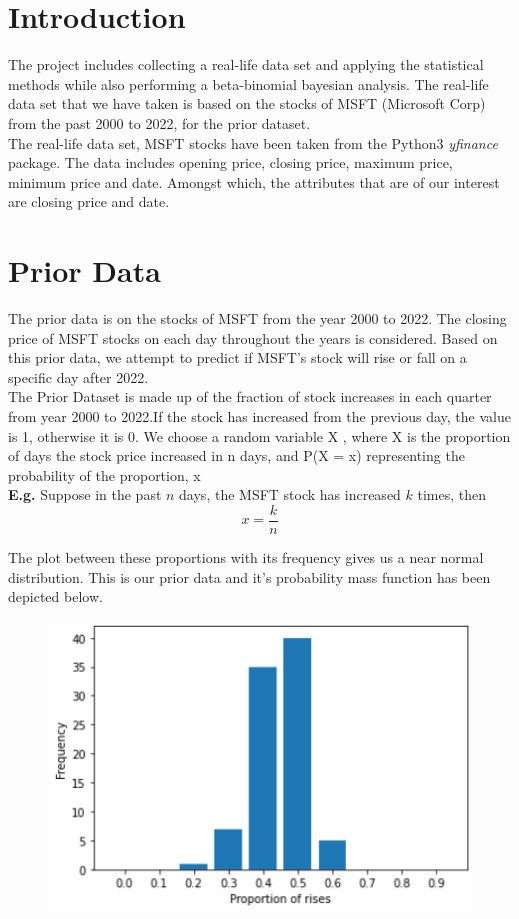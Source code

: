 \documentclass[journal,12pt,twocolumn]{IEEEtran}
\begin{document}
\section{Introduction}
The project includes collecting a real-life data set and applying the statistical methods while also performing a beta-binomial bayesian analysis. The real-life data set that we have taken is based on the stocks of MSFT (Microsoft Corp) from the past 2000 to 2022, for the prior dataset. \\

The real-life data set, MSFT stocks have been taken from the Python3 \textit{yfinance} package. The data includes opening price, closing price, maximum price, minimum price and date. Amongst which, the attributes that are of our interest are closing price and date.

\section{Prior Data}
 The prior data is on the stocks of MSFT from the year 2000 to 2022. The closing price of MSFT stocks on each day throughout the years is considered. Based on this prior data, we attempt to predict if MSFT’s stock
will rise or fall on a specific day after 2022. \\

The Prior Dataset is made up of the fraction of stock increases in each quarter from year 2000 to 2022.If the stock has increased from the previous day, the value is 1, otherwise it is 0. We choose a random variable X , where X is the proportion of days the stock price increased in n days, and P(X = x)
representing the probability of the proportion, x \\

\textbf{E.g.} Suppose in the past $n$ days, the MSFT stock has increased $k$ times, then
\begin{equation}
    x = \frac{k}{n}
\end{equation}

The plot between these proportions with its frequency gives us a near normal distribution. This is our prior data and it's probability mass function has been depicted below.
\begin{figure}[!ht]
\centering
\includegraphics[width=\columnwidth]{Images/FreqVsRise.png}
\end{figure}
\end{document}
